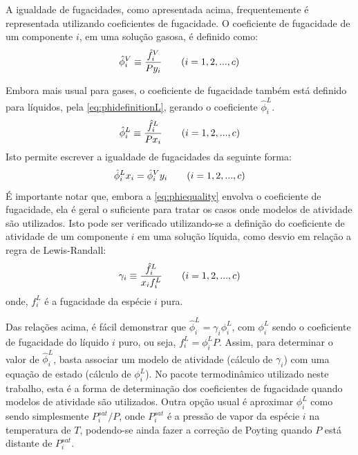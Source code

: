 A igualdade de fugacidades, como apresentada acima, frequentemente é
representada utilizando coeficientes de fugacidade.
O coeficiente de fugacidade de um componente $i$, em uma solução gasosa, é
definido como:
\begin{equation}
\hat{\phi}^V_i \equiv \dfrac{\hat{f}^V_i}{Py_i} \qquad (i = 1,2,...,c) \\
\label{eq:phidefinition}
\end{equation}


Embora mais usual para gases, o coeficiente de fugacidade também
está definido para líquidos, pela \autoref{eq:phidefinitionL}, gerando o coeficiente $\hat{\phi}^L_i$.
\begin{equation}
\hat{\phi}^L_i \equiv \dfrac{\hat{f}^L_i}{Px_i} \qquad (i = 1,2,...,c) \\
\label{eq:phidefinitionL}
\end{equation}
Isto permite escrever a igualdade de fugacidades da seguinte forma:
\begin{equation}
\hat{\phi}^L_i x_i = \hat{\phi}^V_i y_i \qquad (i = 1,2,...,c) \\
\label{eq:phiequality}
\end{equation}
É importante notar que, embora a \autoref{eq:phiequality} envolva o
coeficiente de fugacidade, ela é geral o suficiente para tratar os casos onde
modelos de atividade são utilizados.
Isto pode ser verificado utilizando-se a definição do coeficiente de atividade
de um componente $i$ em uma solução líquida, como desvio em relação a regra de Lewis-Randall:
\begin{equation}
\gamma_i \equiv \dfrac{\hat{f}^L_i}{x_if^L_i} \qquad (i = 1,2,...,c) \\
\label{eq:gammadefinition}
\end{equation}
onde, $f^L_i$ é a fugacidade da espécie $i$ pura.

Das relações acima, é fácil demonstrar que $\hat{\phi}^L_i = \gamma_i \phi^L_i$,
com $\phi^L_i$ sendo o coeficiente de fugacidade do líquido $i$ puro, ou seja, $f^L_i = \phi^L_i P$. Assim,
para determinar o valor de $\hat{\phi}^L_i$,
basta associar um modelo de atividade (cálculo de $\gamma_i$) com uma equação de
estado (cálculo de $\phi^L_i$).
No pacote termodinâmico utilizado neste trabalho, esta é a forma de determinação
dos coeficientes de fugacidade quando modelos de atividade são utilizados.
Outra opção usual é aproximar $\phi^L_i$ como sendo simplesmente $P^{sat}_i/P$, onde
$P^{sat}_i$ é a pressão de vapor da espécie $i$ na temperatura de $T$, podendo-se ainda
fazer a correção de Poyting quando $P$ está distante de $P^{sat}_i$.

